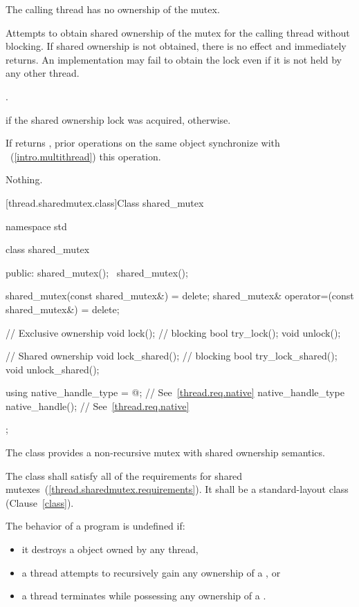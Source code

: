 \begin{itemdescr}
\pnum
\requires The calling thread has no ownership of the mutex.

\pnum
\effects Attempts to obtain shared ownership of the mutex for the calling
thread without blocking. If shared ownership is not obtained, there is no
effect and  immediately returns. An implementation
may fail to obtain the lock even if it is not held by any other thread.

\pnum
\returntype {}.

\pnum
\returns {} if the shared ownership lock was acquired, 
otherwise.

\pnum
\sync If  returns , prior 
operations on the same object synchronize with ~(\ref{intro.multithread}) this
operation.

\pnum
\throws Nothing.
\end{itemdescr}

[thread.sharedmutex.class]{Class shared_mutex}

\begin{codeblock}
namespace std {
  class shared_mutex {
  public:
     shared_mutex();
     ~shared_mutex();

     shared_mutex(const shared_mutex&) = delete;
     shared_mutex& operator=(const shared_mutex&) = delete;

     // Exclusive ownership
     void lock(); // blocking
     bool try_lock();
     void unlock();

     // Shared ownership
     void lock_shared(); // blocking
     bool try_lock_shared();
     void unlock_shared();

     using native_handle_type = @\impdef@; // See~\ref{thread.req.native}
     native_handle_type native_handle();                // See~\ref{thread.req.native}
  };
}
\end{codeblock}

\pnum
The class  provides a non-recursive mutex
with shared ownership semantics.

\pnum
The class  shall satisfy all of the requirements for
shared mutexes~(\ref{thread.sharedmutex.requirements}).
It shall be a standard-layout class (Clause~\ref{class}).

\pnum
The behavior of a program is undefined if:
\begin{itemize}
\item it destroys a  object owned by any thread,
\item a thread attempts to recursively gain any ownership of a , or
\item a thread terminates while possessing any ownership of a .
\end{itemize}

